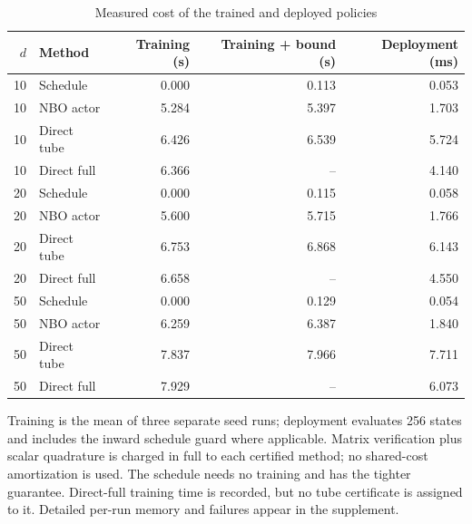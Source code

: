 \begin{table}[htbp]
\centering\small
\caption{Measured cost of the trained and deployed policies}\label{tab:r10cost}
\begin{tabular}{rlrrr}
\toprule
$d$ & Method & Training (s) & Training + bound (s) & Deployment (ms)\\
\midrule
10 & Schedule & 0.000 & 0.113 & 0.053\\
10 & NBO actor & 5.284 & 5.397 & 1.703\\
10 & Direct tube & 6.426 & 6.539 & 5.724\\
10 & Direct full & 6.366 & -- & 4.140\\
20 & Schedule & 0.000 & 0.115 & 0.058\\
20 & NBO actor & 5.600 & 5.715 & 1.766\\
20 & Direct tube & 6.753 & 6.868 & 6.143\\
20 & Direct full & 6.658 & -- & 4.550\\
50 & Schedule & 0.000 & 0.129 & 0.054\\
50 & NBO actor & 6.259 & 6.387 & 1.840\\
50 & Direct tube & 7.837 & 7.966 & 7.711\\
50 & Direct full & 7.929 & -- & 6.073\\
\bottomrule
\end{tabular}
\par\smallskip\begin{minipage}{.97\linewidth}\footnotesize Training is the mean of three separate seed runs; deployment evaluates 256 states and includes the inward schedule guard where applicable. Matrix verification plus scalar quadrature is charged in full to each certified method; no shared-cost amortization is used. The schedule needs no training and has the tighter guarantee. Direct-full training time is recorded, but no tube certificate is assigned to it. Detailed per-run memory and failures appear in the supplement.\end{minipage}
\end{table}
